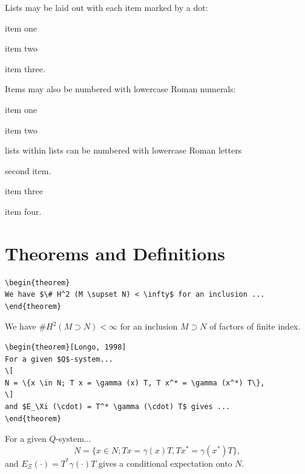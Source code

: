 \documentclass{ws-ijbc}
\begin{document}
Lists may be laid out with each item marked by a dot:
\begin{itemlist}
\item item one
\item item two
\item item three.
\end{itemlist}

Items may also be numbered with lowercase Roman numerals:
\begin{romanlist}[(iii)]
\item item one
\item item two
    \begin{alphlist}[(b)]
    \item lists within lists can be numbered with lowercase Roman letters
    \item second item.
    \end{alphlist}
\item item three
\item item four.
\end{romanlist}

\section{Theorems and Definitions}

\begin{verbatim}
\begin{theorem}
We have $\# H^2 (M \supset N) < \infty$ for an inclusion ...
\end{theorem}
\end{verbatim}


\begin{theorem}
We have $\# H^2 (M \supset N) < \infty$ for an inclusion $M \supset
N$ of factors of finite index.
\end{theorem}


\begin{verbatim}
\begin{theorem}[Longo, 1998]
For a given $Q$-system...
\[
N = \{x \in N; T x = \gamma (x) T, T x^* = \gamma (x^*) T\},
\]
and $E_\Xi (\cdot) = T^* \gamma (\cdot) T$ gives ...
\end{theorem}
\end{verbatim}


\begin{theorem}[Longo, 1998]
For a given $Q$-system...
\[
N = \{x \in N; T x = \gamma (x) T, T x^* = \gamma (x^*) T\},
\]
and $E_\Xi (\cdot) = T^* \gamma (\cdot) T$ gives a conditional
expectation onto $N$.
\end{theorem}
\end{document}
